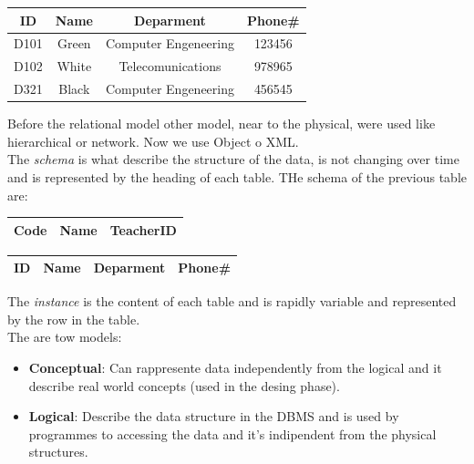 \documentclass[12pt]{article}
\begin{document}
\begin{center}
\begin{tabular}{ |c|c|c|c| }
 \hline
 \textbf{ID} & \textbf{Name} & \textbf{Deparment} & \textbf{Phone\#} \\
 \hline
 \hline
 D101 & Green & Computer Engeneering & 123456\\
 \hline
 D102 & White & Telecomunications & 978965\\
 \hline
 D321 & Black & Computer Engeneering & 456545\\
 \hline
\end{tabular}
\end{center}

Before the relational model other model, near to the physical, were used like hierarchical or network. Now we use Object o XML.\\
The \textit{schema} is what describe the structure of the data, is not changing over time and is represented by the heading of each table. THe schema of the previous table are:
\begin{center}
\begin{tabular}{ |c|c|c| }
 \hline
 \textbf{Code} & \textbf{Name} & \textbf{TeacherID} \\
 \hline
\end{tabular}
\end{center}

\begin{center}
\begin{tabular}{ |c|c|c|c| }
 \hline
 \textbf{ID} & \textbf{Name} & \textbf{Deparment} & \textbf{Phone\#} \\
 \hline
\end{tabular}
\end{center}

The \textit{instance} is the content of each table and is rapidly variable and represented by the row in the table.\\
The are tow models:
\begin{itemize}
  \item \textbf{Conceptual}: Can rappresente data independently from the logical and it describe real world concepts (used in the desing phase).
  \item \textbf{Logical}: Describe the data structure in the DBMS and is used by programmes to accessing the data and it's indipendent from the physical structures.
\end{itemize}
\end{document}
